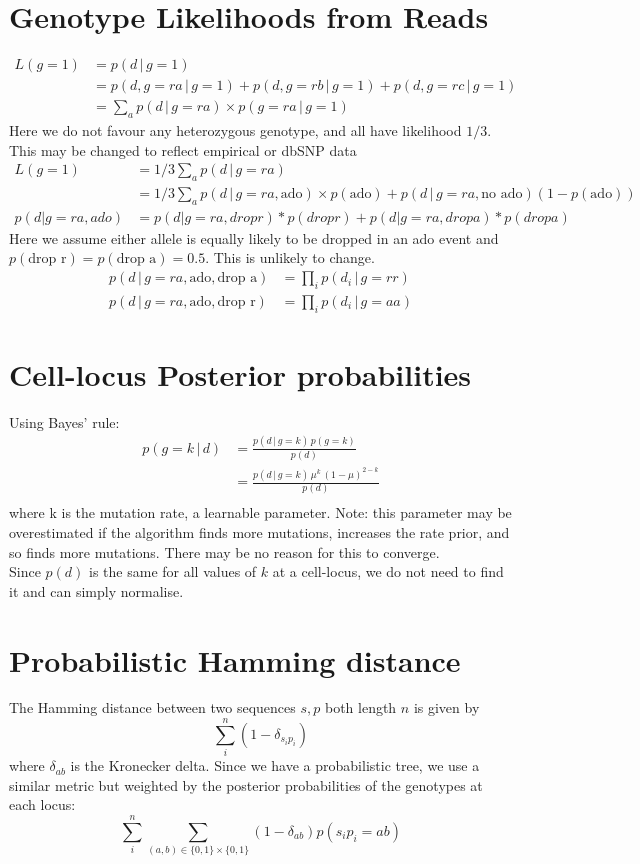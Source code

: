 \documentclass{article}
\begin{document}
\section{Genotype Likelihoods from Reads}
\begin{align*}
L(g=1) &= p(d\,|\,g=1)\\
&=p(d, g=ra \,|\, g=1) + p(d, g=rb \,|\, g=1) + p(d, g=rc \,|\, g=1)\\
&= \sum_a p(d \,|\, g=ra) \times p(g=ra \,|\, g=1)
\end{align*}
Here we do not favour any heterozygous genotype, and all have likelihood $1/3$. This may be changed to reflect empirical or dbSNP data
\begin{align*}
L(g=1) &= 1/3 \sum_a p(d \,|\, g=ra)\\
&= 1/3 \sum_a p(d \,|\, g=ra, \text{ado}) \times p(\text{ado}) + p(d \,|\, g=ra, \text{no ado})(1-p(\text{ado}))\\
p(d|g=ra, ado) &= p(d|g=ra, drop r) * p(drop r) + p(d|g=ra, drop a) * p(drop a)
\end{align*}
Here we assume either allele is equally likely to be dropped in an ado event and $p(\text{drop r}) = p(\text{drop a}) = 0.5$. This is unlikely to change.
\begin{align*}
p(d \,|\, g=ra, \text{ado}, \text{drop a}) &= \prod_i p(d_i \,|\, g=rr)\\
p(d \,|\, g=ra, \text{ado}, \text{drop r}) &= \prod_i p(d_i \,|\, g=aa)
\end{align*}

\section{Cell-locus Posterior probabilities}
Using Bayes' rule:
\begin{align*}
p(g=k\,|\, d) &= \frac{p(d\,|\,g=k)\,p(g=k)}{p(d)}\\
&= \frac{p(d\,|\,g=k)\,\mu^k\,(1-\mu)^{2-k}}{p(d)}\\
\end{align*}
where k is the mutation rate, a learnable parameter. Note: this parameter may be overestimated if the algorithm finds more mutations, increases the rate prior, and so finds more mutations. There may be no reason for this to converge.\\
Since $p(d)$ is the same for all values of $k$ at a cell-locus, we do not need to find it and can simply normalise.

\section{Probabilistic Hamming distance}
The Hamming distance between two sequences $s,p$ both length $n$ is given by \[\sum\limits_i^n (1-\delta_{s_ip_i})\] where $\delta_{ab}$ is the Kronecker delta.
Since we have a probabilistic tree, we use a similar metric but weighted by the posterior probabilities of the genotypes at each locus:
\[\sum\limits_i^n \sum\limits_{(a,b)\in\{0,1\}\times\{0,1\}}(1-\delta_{ab})p(s_ip_i = ab)\]
\end{document}
